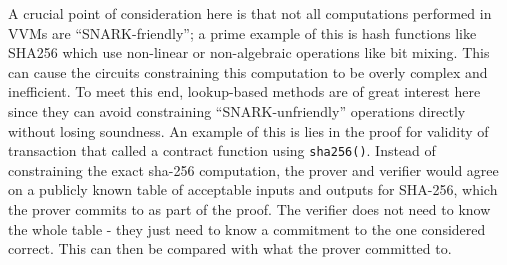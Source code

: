 \noindent A crucial point of consideration here is that not all computations performed in VVMs are ``SNARK-friendly''; a prime example of this is hash functions like SHA256 which use non-linear or non-algebraic operations like bit mixing. This can cause the circuits constraining this computation to be overly complex and inefficient. To meet this end, lookup-based methods are of great interest here since they can avoid constraining ``SNARK-unfriendly'' operations directly without losing soundness. An example of this is lies in the proof for validity of transaction that called a contract function using \texttt{sha256()}. Instead of constraining the exact sha-256 computation, the prover and verifier would agree on a publicly known table of acceptable inputs and outputs for SHA-256, which the prover commits to as part of the proof. The verifier does not need to know the whole table - they just need to know a commitment to the one considered correct. This can then be compared with what the prover committed to.\\
